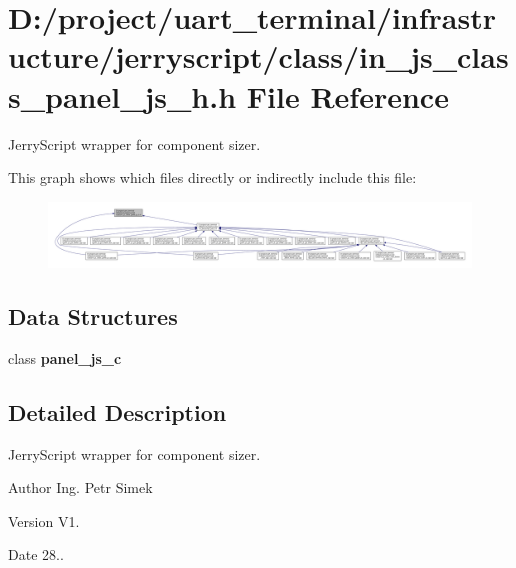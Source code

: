 \section{D\+:/project/uart\+\_\+terminal/infrastructure/jerryscript/class/in\+\_\+js\+\_\+class\+\_\+panel\+\_\+js\+\_\+h.h File Reference}
\label{in__js__class__panel__js__h_8h}


Jerry\+Script wrapper for component sizer.  


This graph shows which files directly or indirectly include this file\+:
\nopagebreak
\begin{figure}[H]
\begin{center}
\leavevmode
\includegraphics[width=350pt]{in__js__class__panel__js__h_8h__dep__incl}
\end{center}
\end{figure}
\subsection*{Data Structures}
\begin{DoxyCompactItemize}
\item 
class \textbf{ panel\+\_\+js\+\_\+c}
\end{DoxyCompactItemize}


\subsection{Detailed Description}
Jerry\+Script wrapper for component sizer. 

\begin{DoxyAuthor}{Author}
Ing. Petr Simek 
\end{DoxyAuthor}
\begin{DoxyVersion}{Version}
V1. 
\end{DoxyVersion}
\begin{DoxyDate}{Date}
28.. 
\end{DoxyDate}
